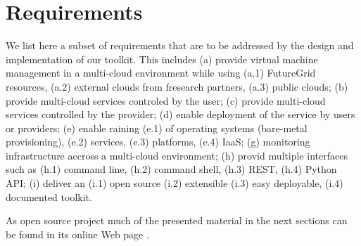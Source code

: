\documentclass{tex/sig-alternate-2013}
\newcommand{\todo}[1]{{\color{red}{#1}}}
\newcommand{\READ}{\todo{READ}}
\begin{document}

\section{Requirements \READ} \label{S:requirements}

We list here a subset of requirements that are to be addressed by the
design and implementation of our toolkit. This includes (a) provide
virtual machine management in a multi-cloud environment while using
(a.1) FutureGrid resources, (a.2) external clouds from fresearch
partners, (a.3) public clouds; (b) provide multi-cloud services
controled by the user; (c) provide multi-cloud services controlled by
the provider; (d) enable deployment of the service by users or
providers; (e) enable raining (e.1) of operating systems (bare-metal
provisioning), (e.2) services, (e.3) platforms, (e.4) IaaS; (g)
monitoring infrastructure accross a multi-cloud environment; (h)
provid multiple interfaces such as (h.1) command line, (h.2) command shell, (h.3) REST,
(h.4) Python API; (i) deliver an (i.1) open source (i.2) extensible (i.3) easy
deployable, (i.4) documented toolkit.

As open source project much of the presented material in the next
sections can be found in its online Web page
\cite{github-cloudmesh}. 
\end{document}
